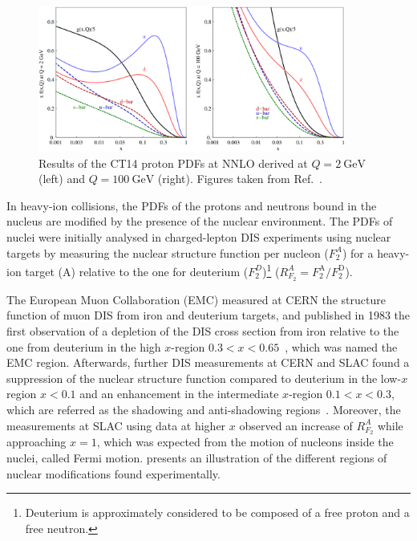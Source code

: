 \begin{figure}[!htb]
 \centering
 \includegraphics[width=0.9\textwidth]{Figures/WBoson/Theory/CT14NNLO.png}
 \caption{Results of the CT14 proton PDFs at NNLO derived at $Q = \SI{2}{\GeV}$ (left) and $Q = \SI{100}{\GeV}$ (right). Figures taken from Ref.~\cite{CT14}.}
 \label{fig:CT14}
\end{figure}

In heavy-ion collisions, the PDFs of the protons and neutrons bound in the nucleus are modified by the presence of the nuclear environment. The PDFs of nuclei were initially analysed in charged-lepton DIS experiments using nuclear targets by measuring the nuclear structure function per nucleon ($F^{A}_{2}$) for a heavy-ion target (A) relative to the one for deuterium ($F^{D}_{2}$)\footnote{Deuterium is approximately considered to be composed of a free proton and a free neutron.} ($R^{A}_{F_{2}} = F^{\text{A}}_{2}/F^{\text{D}}_{2}$). 

The European Muon Collaboration (EMC) measured at CERN the structure function of muon DIS from iron and deuterium targets, and published in 1983 the first observation of a depletion of the DIS cross section from iron relative to the one from deuterium in the high $x$-region $0.3 < x < 0.65$~\cite{EMCStrucFunc_1}, which was named the EMC region. Afterwards, further DIS measurements at CERN and SLAC found a suppression of the nuclear structure function compared to deuterium in the low-$x$ region $x < 0.1$ and an enhancement in the intermediate $x$-region $0.1 < x < 0.3$, which are referred as the shadowing and anti-shadowing regions~\cite{EMCStrucFunc_2}. Moreover, the measurements at SLAC using data at higher $x$ observed an increase of $R^{A}_{F_{2}}$ while approaching $x = 1$, which was expected from the motion of nucleons inside the nuclei, called Fermi motion.  presents an illustration of the different regions of nuclear modifications found experimentally.

